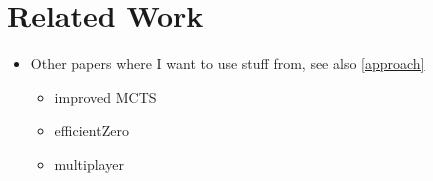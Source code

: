 \chapter{Related Work}

\begin{itemize}
    \item Other papers where I want to use stuff from, see also \ref{approach}
    \begin{itemize}
        \item improved MCTS \cite{mcts_po}
        \item efficientZero \cite{efficientzero}
        \item multiplayer 
    \end{itemize}
\end{itemize}
